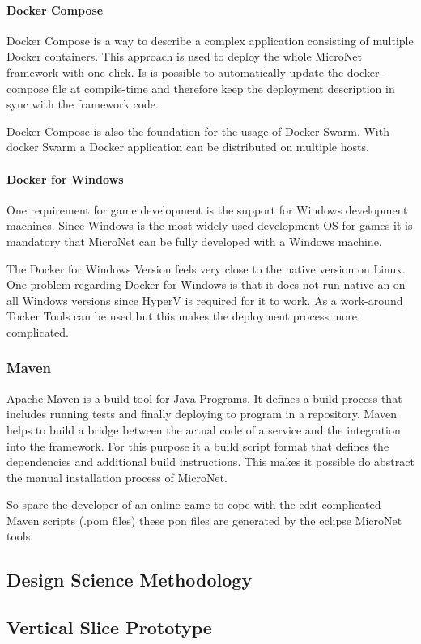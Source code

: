 \paragraph{Docker Compose}

Docker Compose is a way to describe a complex application consisting of multiple
Docker containers. This approach is used to deploy the whole MicroNet framework
with one click. Is is possible to automatically update the docker-compose file
at compile-time and therefore keep the deployment description in sync with the
framework code.

Docker Compose is also the foundation for the usage of Docker Swarm. With docker
Swarm a Docker application can be distributed on multiple hosts. 

\paragraph{Docker for Windows}

One requirement for game development is the support for Windows development
machines. Since Windows is the most-widely used development OS for games it is
mandatory that MicroNet can be fully developed with a Windows machine. 

The Docker for Windows Version feels very close to the native version on Linux.
One problem regarding Docker for Windows is that it does not run native an on
all Windows versions since HyperV is required for it to work. As a work-around
Tocker Tools can be used but this makes the deployment process more complicated.

\subsubsection{Maven}

Apache Maven is a build tool for Java Programs. It defines a build process that
includes running tests and finally deploying to program in a repository. Maven
helps to build a bridge between the actual code of a service and the integration
into the framework. For this purpose it a build script format that defines the
dependencies and additional build instructions. This makes it possible do
abstract the manual installation process of MicroNet. 

So spare the developer of an online game to cope with the edit complicated Maven
scripts (.pom files) these pon files are generated by the eclipse MicroNet
tools.

\subsection{Design Science Methodology}
\subsection{Vertical Slice Prototype}
